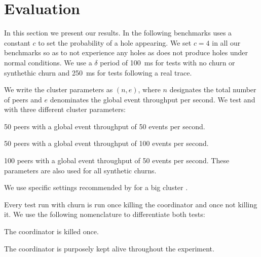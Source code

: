 
\section{Evaluation}
\label{sec:evaluation}
In this section we present our results. In the following benchmarks \epto uses a constant $c$ to set the probability of a hole appearing. We set $c = 4$ in all our benchmarks so as to not experience any holes as \jgroups does not produce holes under normal conditions. We use a $\delta$ period of \SI{100}{\milli\second} for tests with no churn or synthethic churn and \SI{250}{\milli\second} for tests following a real trace.
\par
We write the cluster parameters as $(n,e)$, where $n$ designates the total number of peers and $e$ denominates the global event throughput per second. We test \epto and \jgroups with three different cluster parameters:
\begin{description}[\IEEEsetlabelwidth{$(100,100)$:}]
	\item[\textbf{$(50,50)$}:] 50 peers with a global event throughput of 50 events per second.
	\item[\textbf{$(50,100)$}:] 50 peers with a global event throughput of 100 events per second.
	\item[\textbf{$(100,50)$}:] 100 peers with a global event throughput of 50 events per second. These parameters are also used for all synthetic churns.
\end{description}
\par 
We use specific settings recommended by \jgroups for a big cluster \autocite{udp-largecluster}.
\par
Every \jgroups test run with churn is run once killing the coordinator and once not killing it. We use the following nomenclature to differentiate both tests:
\begin{description}
	\item[\textbf{\jgroups-coord}:] The coordinator is killed once.
	\item[\textbf{\jgroups-nocoord}:] The coordinator is purposely kept alive throughout the experiment.
\end{description}
